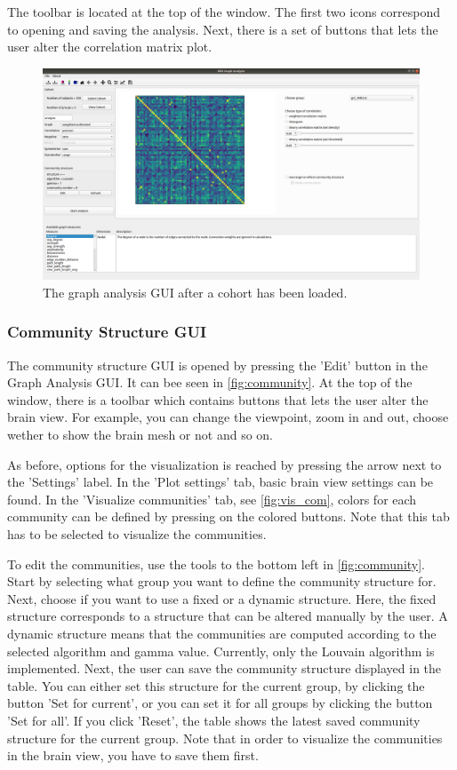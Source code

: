 \documentclass{article}
\begin{document}
The toolbar is located at the top of the window. The first two icons correspond to opening and saving the analysis. Next, there is a set of buttons that lets the user alter the correlation matrix plot.

\begin{figure}[H]
    \centering
    \includegraphics[width=0.9\linewidth]{graph_analysis_cohort.png}
    \caption{The graph analysis GUI after a cohort has been loaded.}
    \label{fig:started}
\end{figure}

\subsubsection{Community Structure GUI}

The community structure GUI is opened by pressing the 'Edit' button in the Graph Analysis GUI. It can bee seen in \cref{fig:community}. At the top of the window, there is a toolbar which contains buttons that lets the user alter the brain view. For example, you can change the viewpoint, zoom in and out, choose wether to show the brain mesh or not and so on.

As before, options for the visualization is reached by pressing the arrow next to the 'Settings' label. In the 'Plot settings' tab, basic brain view settings can be found. In the 'Visualize communities' tab, see \cref{fig:vis_com}, colors for each community can be defined by pressing on the colored buttons. Note that this tab has to be selected to visualize the communities. 

To edit the communities, use the tools to the bottom left in \cref{fig:community}. Start by selecting what group you want to define the community structure for. Next, choose if you want to use a fixed or a dynamic structure. Here, the fixed structure corresponds to a structure that can be altered manually by the user. A dynamic structure means that the communities are computed according to the selected algorithm and gamma value. Currently, only the Louvain algorithm is implemented. Next, the user can save the community structure displayed in the table. You can either set this structure for the current group, by clicking the button 'Set for current', or you can set it for all groups by clicking the button 'Set for all'. If you click 'Reset', the table shows the latest saved community structure for the current group. Note that in order to visualize the communities in the brain view, you have to save them first.
\end{document}
